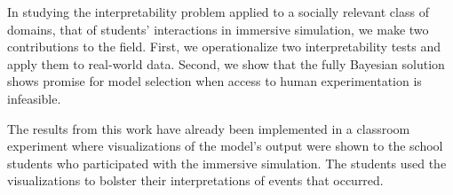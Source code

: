 \documentclass[letterpaper]{article} %
\newcommand{\kibitz}[2]{\ifnum\Comments=1{\textcolor{#1}{#2}}\fi}
\newcommand{\nh}[1]{\kibitz{blue}{[NH:#1]}}
\newcommand{\kg}[1]{\kibitz{red}{[KG:#1]}}
\begin{document}



In studying the interpretability problem applied to a socially relevant class of domains, that of students' interactions in immersive simulation, we make two contributions to the field.
First, we operationalize two interpretability tests and apply them to real-world data.
Second, we show that the fully Bayesian solution shows promise for model selection when access to human experimentation is infeasible.

The results from this work have already been implemented in a classroom experiment where visualizations of the model's output were shown to the school students who participated with the immersive simulation. The students used the visualizations to bolster their interpretations of events that occurred.
\end{document}
